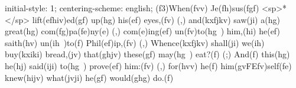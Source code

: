 initial-style: 1;
centering-scheme: english;
(f3)When(fvv) Je(fh)sus(fgf) <sp>*</sp> lift(efhiv)ed(gf) up(hg) his(ef) eyes,(fv) (,) and(kxfjkv) saw(ji) a(hg) great(hg) com(fg)pa(fe)ny(e) (,) com(e)ing(ef) un(fv)to(hg~) him,(hi) he(ef) saith(hv) un(ih~)to(f) Phil(ef)ip,(fv) (,) Whence(kxfjkv) shall(ji) we(ih) buy(kxiki) bread,(jv) that(ghjv) these(gf) may(hg~) eat?(f) (;) And(f) this(hg) he(hj) said(iji) to(hg~) prove(ef) him:(fv) (,) for(hvv) he(f) him(gvFEfv)self(fe) knew(hijv) what(jvji) he(gf) would(ghg) do.(f)
